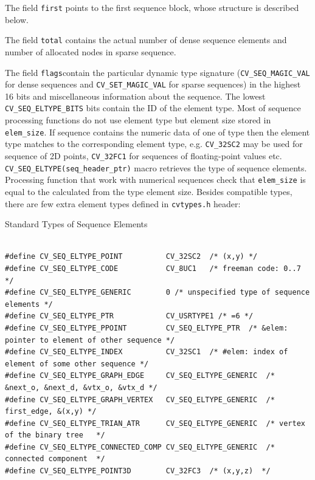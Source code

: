 The field \texttt{first} points to the first sequence block, whose structure is described below.

The field \texttt{total} contains the actual number of dense sequence elements and number of allocated nodes in sparse sequence.

The field \texttt{flags}contain the particular dynamic type
signature (\texttt{CV\_SEQ\_MAGIC\_VAL} for dense sequences and
\texttt{CV\_SET\_MAGIC\_VAL} for sparse sequences) in the highest 16
bits and miscellaneous information about the sequence. The lowest
\texttt{CV\_SEQ\_ELTYPE\_BITS} bits contain the ID of the element
type. Most of sequence processing functions do not use element type but
element size stored in \texttt{elem\_size}. If sequence contains the
numeric data of one of  type then the element type matches
to the corresponding  element type, e.g. \texttt{CV\_32SC2} may be
used for sequence of 2D points, \texttt{CV\_32FC1} for sequences of floating-point
values etc. \texttt{CV\_SEQ\_ELTYPE(seq\_header\_ptr)} macro retrieves the
type of sequence elements. Processing function that work with numerical
sequences check that \texttt{elem\_size} is equal to the calculated from
the type element size. Besides  compatible types, there
are few extra element types defined in \texttt{cvtypes.h} header:

Standard Types of Sequence Elements

\begin{lstlisting}

#define CV_SEQ_ELTYPE_POINT          CV_32SC2  /* (x,y) */
#define CV_SEQ_ELTYPE_CODE           CV_8UC1   /* freeman code: 0..7 */
#define CV_SEQ_ELTYPE_GENERIC        0 /* unspecified type of sequence elements */
#define CV_SEQ_ELTYPE_PTR            CV_USRTYPE1 /* =6 */
#define CV_SEQ_ELTYPE_PPOINT         CV_SEQ_ELTYPE_PTR  /* &elem: pointer to element of other sequence */
#define CV_SEQ_ELTYPE_INDEX          CV_32SC1  /* #elem: index of element of some other sequence */
#define CV_SEQ_ELTYPE_GRAPH_EDGE     CV_SEQ_ELTYPE_GENERIC  /* &next_o, &next_d, &vtx_o, &vtx_d */
#define CV_SEQ_ELTYPE_GRAPH_VERTEX   CV_SEQ_ELTYPE_GENERIC  /* first_edge, &(x,y) */
#define CV_SEQ_ELTYPE_TRIAN_ATR      CV_SEQ_ELTYPE_GENERIC  /* vertex of the binary tree   */
#define CV_SEQ_ELTYPE_CONNECTED_COMP CV_SEQ_ELTYPE_GENERIC  /* connected component  */
#define CV_SEQ_ELTYPE_POINT3D        CV_32FC3  /* (x,y,z)  */

\end{lstlisting}

